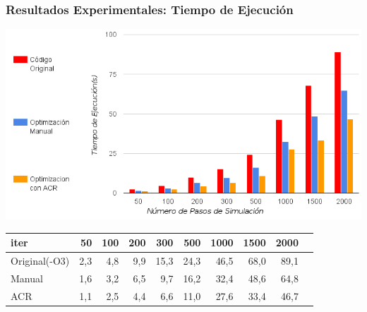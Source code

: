 \documentclass{beamer}\usetheme{Madrid} %
\begin{document}
\begin{frame}
\frametitle{Resultados Experimentales: Tiempo de Ejecución}
\begin{center}
\includegraphics[scale=0.55]{img/tiempos_recortado_2.png}
\end{center}
\begin{tabular}{|l|r|r|r|r|r|r|r|r|p{5cm}|}
\hline
iter   & 50  & 100 & 200 & 300  & 500  & 1000 & 1500 & 2000 \\ \hline
Original(-O3) & 2,3 & 4,8 & 9,9 & 15,3 & 24,3 & 46,5 & 68,0 & 89,1 \\ \hline
Manual   & 1,6 & 3,2 & 6,5 & 9,7  & 16,2 & 32,4 & 48,6 & 64,8 \\ \hline 
ACR      & 1,1 & 2,5 & 4,4 & 6,6  & 11,0 & 27,6 & 33,4 & 46,7 \\ \hline 
\end{tabular}


\end{frame}
\end{document}
